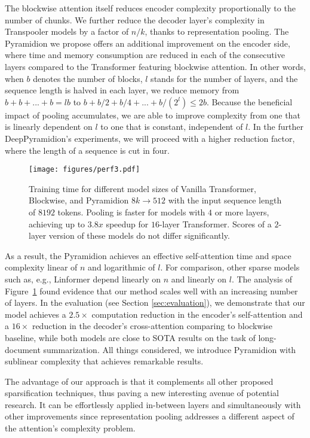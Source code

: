 \documentclass{article}
\begin{document}
The blockwise attention itself reduces encoder complexity proportionally to the number of chunks.
We further reduce the decoder layer's complexity in Transpooler models by a factor of $n/k$, thanks to representation pooling. The Pyramidion we propose offers an additional improvement on the encoder side, where time and memory consumption are reduced in each of the consecutive layers compared to the Transformer featuring blockwise attention. In other words, when $b$ denotes the number of blocks, $l$ stands for the number of layers, and the sequence length is halved in each layer, we reduce memory from $b + b + ... + b = lb$ to $b + b/2 + b/4 + ... + b/(2^l) \leq 2b$.
Because the beneficial impact of pooling accumulates, we are able to improve complexity from one that is linearly dependent on $l$ to one that is constant, independent of $l$. In the further DeepPyramidion's experiments, we will proceed with a higher reduction factor, where the length of a sequence is cut in four.

\begin{figure}
        \centering
        \texttt{[image: figures/perf3.pdf]}
        \caption{Training time for different model sizes of Vanilla Transformer, Blockwise, and Pyramidion $8k\rightarrow512$ with the input sequence length of $8192$ tokens.
        Pooling is faster for models with $4$ or more layers, achieving up to $3.8x$ speedup for $16$-layer Transformer. Scores of a $2$-layer version of these models do not differ significantly.
        }
        \label{fig:performance_benchmark}
\end{figure}

As a result, the Pyramidion achieves an effective self-attention time and space complexity linear of $n$ and logarithmic of $l$. 
For comparison, other sparse models such as, e.g., Linformer depend linearly on $n$ and linearly on $l$. The analysis of Figure~\ref{fig:performance_benchmark} found evidence that our method scales well with an increasing number of layers. In the evaluation (see Section \ref{sec:evaluation}), we demonstrate that our model achieves a $2.5\times$ computation reduction in the encoder's self-attention and a $16\times$ reduction in the decoder's cross-attention comparing to blockwise baseline, while both models are close to SOTA results on the task of long-document summarization.
All things considered, we introduce Pyramidion with sublinear complexity that achieves remarkable results.

The advantage of our approach is that it complements all other proposed sparsification techniques, thus paving a new interesting avenue of potential research. 
It can be effortlessly applied in-between layers and simultaneously with other improvements since representation pooling addresses a different aspect of the attention's complexity problem.
\end{document}
